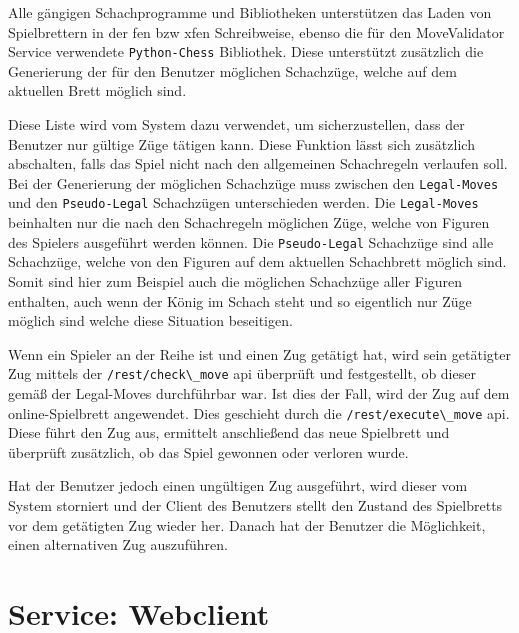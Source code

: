 Alle gängigen Schachprogramme und Bibliotheken unterstützen das Laden
von Spielbrettern in der \gls{fen} bzw \gls{xfen} Schreibweise, ebenso
die für den MoveValidator Service verwendete
\passthrough{\lstinline!Python-Chess!}\cite{pythonchesslib}
Bibliothek. Diese unterstützt zusätzlich die Generierung der für den
Benutzer möglichen Schachzüge, welche auf dem aktuellen Brett möglich
sind.

Diese Liste wird vom System dazu verwendet, um sicherzustellen, dass der
Benutzer nur gültige Züge tätigen kann. Diese Funktion lässt sich
zusätzlich abschalten, falls das Spiel nicht nach den allgemeinen
Schachregeln verlaufen soll. Bei der Generierung der möglichen
Schachzüge muss zwischen den \passthrough{\lstinline!Legal-Moves!} und
den \passthrough{\lstinline!Pseudo-Legal!} Schachzügen unterschieden
werden. Die \passthrough{\lstinline!Legal-Moves!} beinhalten nur die
nach den Schachregeln möglichen Züge, welche von Figuren des Spielers
ausgeführt werden können. Die \passthrough{\lstinline!Pseudo-Legal!}
Schachzüge sind alle Schachzüge, welche von den Figuren auf dem
aktuellen Schachbrett möglich sind. Somit sind hier zum Beispiel auch
die möglichen Schachzüge aller Figuren enthalten, auch wenn der König im
Schach steht und so eigentlich nur Züge möglich sind welche diese
Situation beseitigen.

Wenn ein Spieler an der Reihe ist und einen Zug getätigt hat, wird sein
getätigter Zug mittels der \passthrough{\lstinline!/rest/check\_move!}
\gls{api} überprüft und festgestellt, ob dieser gemäß der Legal-Moves
durchführbar war. Ist dies der Fall, wird der Zug auf dem
online-Spielbrett angewendet. Dies geschieht durch die
\passthrough{\lstinline!/rest/execute\_move!} \gls{api}. Diese führt den
Zug aus, ermittelt anschließend das neue Spielbrett und überprüft
zusätzlich, ob das Spiel gewonnen oder verloren wurde.

Hat der Benutzer jedoch einen ungültigen Zug ausgeführt, wird dieser vom
System storniert und der Client des Benutzers stellt den Zustand des
Spielbretts vor dem getätigten Zug wieder her. Danach hat der Benutzer
die Möglichkeit, einen alternativen Zug auszuführen.

\hypertarget{service-webclient}{%
\section{Service: Webclient}\label{service-webclient}}

